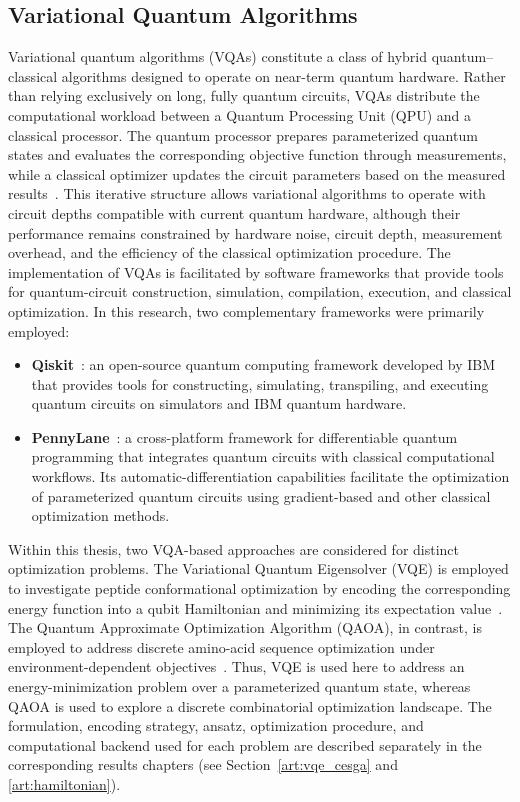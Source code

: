 \subsection{Variational Quantum Algorithms}
Variational quantum algorithms (VQAs) constitute a class of hybrid quantum--classical algorithms designed to operate on near-term quantum hardware. Rather than relying exclusively on long, fully quantum circuits, VQAs distribute the computational workload between a Quantum Processing Unit (QPU) and a classical processor. The quantum processor prepares parameterized quantum states and evaluates the corresponding objective function through measurements, while a classical optimizer updates the circuit parameters based on the measured results~\cite{preskill1998quantum}. This iterative structure allows variational algorithms to operate with circuit depths compatible with current quantum hardware, although their performance remains constrained by hardware noise, circuit depth, measurement overhead, and the efficiency of the classical optimization procedure.
The implementation of VQAs is facilitated by software frameworks that provide tools for quantum-circuit construction, simulation, compilation, execution, and classical optimization. In this research, two complementary frameworks were primarily employed:
\begin{itemize}
\item \textbf{Qiskit}~\cite{Qiskit}: an open-source quantum computing framework developed by IBM that provides tools for constructing, simulating, transpiling, and executing quantum circuits on simulators and IBM quantum hardware.
\item \textbf{PennyLane}~\cite{pennylane}: a cross-platform framework for differentiable quantum programming that integrates quantum circuits with classical computational workflows. Its automatic-differentiation capabilities facilitate the optimization of parameterized quantum circuits using gradient-based and other classical optimization methods.
\end{itemize}
Within this thesis, two VQA-based approaches are considered for distinct optimization problems. The Variational Quantum Eigensolver (VQE) is employed to investigate peptide conformational optimization by encoding the corresponding energy function into a qubit Hamiltonian and minimizing its expectation value~\cite{DANI_CUANTICA}. The Quantum Approximate Optimization Algorithm (QAOA), in contrast, is employed to address discrete amino-acid sequence optimization under environment-dependent objectives~\cite{DANI_HAMILTONIAN}. Thus, VQE is used here to address an energy-minimization problem over a parameterized quantum state, whereas QAOA is used to explore a discrete combinatorial optimization landscape. The formulation, encoding strategy, ansatz, optimization procedure, and computational backend used for each problem are described separately in the corresponding results chapters (see Section~\ref{art:vqe_cesga} and \ref{art:hamiltonian}).



